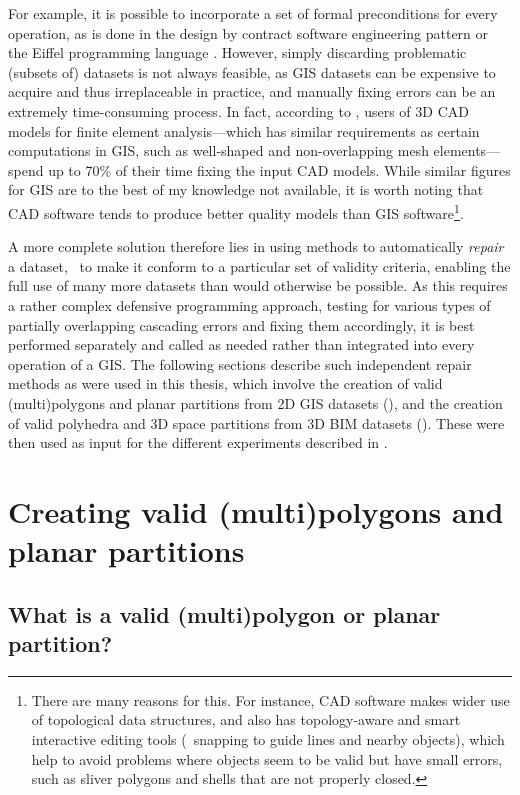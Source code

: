 For example, it is possible to incorporate a set of formal preconditions for every operation, as is done in the design by contract software engineering pattern \citep{Meyer86} or the Eiffel programming language \citep{ISO/IEC25436:2007}.
However, simply discarding problematic (subsets of) datasets is not always feasible, as GIS datasets can be expensive to acquire and thus irreplaceable in practice, and manually fixing errors can be an extremely time-consuming process.
In fact, according to \citet{McKenney98}, users of 3D CAD models for finite element analysis---which has similar requirements as certain computations in GIS, such as well-shaped and non-overlapping mesh elements---spend up to 70\% of their time fixing the input CAD models.
While similar figures for GIS are to the best of my knowledge not available, it is worth noting that CAD software tends to produce better quality models than GIS software\footnote{There are many reasons for this. For instance, CAD software makes wider use of topological data structures, and also has topology-aware and smart interactive editing tools (\eg\ snapping to guide lines and nearby objects), which help to avoid problems where objects seem to be valid but have small errors, such as sliver polygons and shells that are not properly closed.}.

A more complete solution therefore lies in using methods to automatically \emph{repair} a dataset, \ie\ to make it conform to a particular set of validity criteria, enabling the full use of many more datasets than would otherwise be possible.
As this requires a rather complex defensive programming approach, testing for various types of partially overlapping cascading errors and fixing them accordingly, it is best performed separately and called as needed rather than integrated into every operation of a GIS.\@
The following sections describe such independent repair methods as were used in this thesis, which involve the creation of valid (multi)polygons and planar partitions from 2D GIS datasets (), and the creation of valid polyhedra and 3D space partitions from 3D BIM datasets ().
These were then used as input for the different experiments described in .

\section{Creating valid (multi)polygons and planar partitions}
\label{se:pprepair}

\subsection{What is a valid (multi)polygon or planar partition?}

